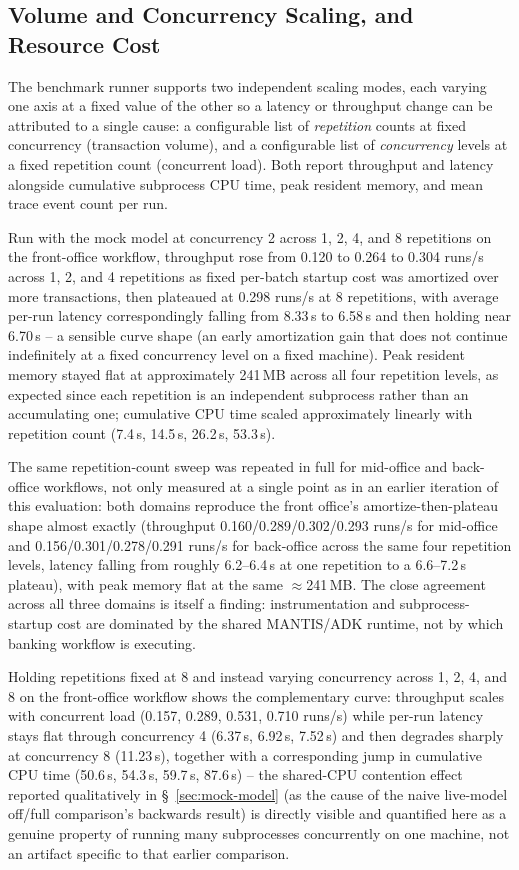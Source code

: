 \documentclass[conference]{IEEEtran}
\begin{document}
\subsection{Volume and Concurrency Scaling, and Resource Cost}
\label{sec:scaling}
The benchmark runner supports two independent scaling modes, each varying one axis at a fixed value of the other so a latency or throughput change can be attributed to a single cause: a configurable list of \emph{repetition} counts at fixed concurrency (transaction volume), and a configurable list of \emph{concurrency} levels at a fixed repetition count (concurrent load). Both report throughput and latency alongside cumulative subprocess CPU time, peak resident memory, and mean trace event count per run.

Run with the mock model at concurrency 2 across 1, 2, 4, and 8 repetitions on the front-office workflow, throughput rose from 0.120 to 0.264 to 0.304 runs/s across 1, 2, and 4 repetitions as fixed per-batch startup cost was amortized over more transactions, then plateaued at 0.298 runs/s at 8 repetitions, with average per-run latency correspondingly falling from 8.33\,s to 6.58\,s and then holding near 6.70\,s -- a sensible curve shape (an early amortization gain that does not continue indefinitely at a fixed concurrency level on a fixed machine). Peak resident memory stayed flat at approximately 241\,MB across all four repetition levels, as expected since each repetition is an independent subprocess rather than an accumulating one; cumulative CPU time scaled approximately linearly with repetition count (7.4\,s, 14.5\,s, 26.2\,s, 53.3\,s).

The same repetition-count sweep was repeated in full for mid-office and back-office workflows, not only measured at a single point as in an earlier iteration of this evaluation: both domains reproduce the front office's amortize-then-plateau shape almost exactly (throughput 0.160/0.289/0.302/0.293 runs/s for mid-office and 0.156/0.301/0.278/0.291 runs/s for back-office across the same four repetition levels, latency falling from roughly 6.2--6.4\,s at one repetition to a 6.6--7.2\,s plateau), with peak memory flat at the same $\approx$241\,MB. The close agreement across all three domains is itself a finding: instrumentation and subprocess-startup cost are dominated by the shared MANTIS/ADK runtime, not by which banking workflow is executing.

Holding repetitions fixed at 8 and instead varying concurrency across 1, 2, 4, and 8 on the front-office workflow shows the complementary curve: throughput scales with concurrent load (0.157, 0.289, 0.531, 0.710 runs/s) while per-run latency stays flat through concurrency 4 (6.37\,s, 6.92\,s, 7.52\,s) and then degrades sharply at concurrency 8 (11.23\,s), together with a corresponding jump in cumulative CPU time (50.6\,s, 54.3\,s, 59.7\,s, 87.6\,s) -- the shared-CPU contention effect reported qualitatively in \S~\ref{sec:mock-model} (as the cause of the naive live-model off/full comparison's backwards result) is directly visible and quantified here as a genuine property of running many subprocesses concurrently on one machine, not an artifact specific to that earlier comparison.
\end{document}
